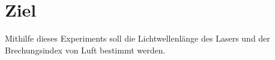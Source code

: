 \section{Ziel}

Mithilfe dieses Experiments soll die Lichtwellenlänge des Lasers und der Brechungsindex von Luft bestimmt werden.